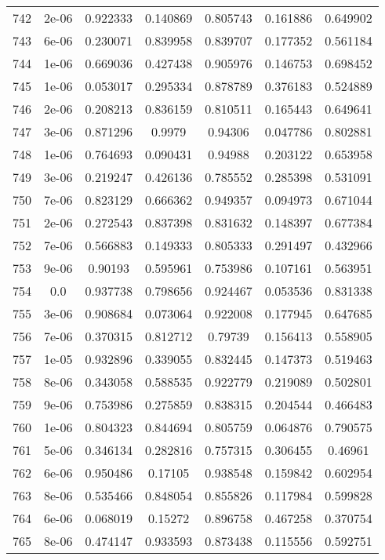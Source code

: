 \begin{table}
\begin{tabular*}{\linewidth}{c|c|c|c|c|c|c}
742 & 2e-06 & 0.922333 & 0.140869 & 0.805743 & 0.161886 & 0.649902\\
743 & 6e-06 & 0.230071 & 0.839958 & 0.839707 & 0.177352 & 0.561184\\
744 & 1e-06 & 0.669036 & 0.427438 & 0.905976 & 0.146753 & 0.698452\\
745 & 1e-06 & 0.053017 & 0.295334 & 0.878789 & 0.376183 & 0.524889\\
746 & 2e-06 & 0.208213 & 0.836159 & 0.810511 & 0.165443 & 0.649641\\
747 & 3e-06 & 0.871296 & 0.9979 & 0.94306 & 0.047786 & 0.802881\\
748 & 1e-06 & 0.764693 & 0.090431 & 0.94988 & 0.203122 & 0.653958\\
749 & 3e-06 & 0.219247 & 0.426136 & 0.785552 & 0.285398 & 0.531091\\
750 & 7e-06 & 0.823129 & 0.666362 & 0.949357 & 0.094973 & 0.671044\\
751 & 2e-06 & 0.272543 & 0.837398 & 0.831632 & 0.148397 & 0.677384\\
752 & 7e-06 & 0.566883 & 0.149333 & 0.805333 & 0.291497 & 0.432966\\
753 & 9e-06 & 0.90193 & 0.595961 & 0.753986 & 0.107161 & 0.563951\\
754 & 0.0 & 0.937738 & 0.798656 & 0.924467 & 0.053536 & 0.831338\\
755 & 3e-06 & 0.908684 & 0.073064 & 0.922008 & 0.177945 & 0.647685\\
756 & 7e-06 & 0.370315 & 0.812712 & 0.79739 & 0.156413 & 0.558905\\
757 & 1e-05 & 0.932896 & 0.339055 & 0.832445 & 0.147373 & 0.519463\\
758 & 8e-06 & 0.343058 & 0.588535 & 0.922779 & 0.219089 & 0.502801\\
759 & 9e-06 & 0.753986 & 0.275859 & 0.838315 & 0.204544 & 0.466483\\
760 & 1e-06 & 0.804323 & 0.844694 & 0.805759 & 0.064876 & 0.790575\\
761 & 5e-06 & 0.346134 & 0.282816 & 0.757315 & 0.306455 & 0.46961\\
762 & 6e-06 & 0.950486 & 0.17105 & 0.938548 & 0.159842 & 0.602954\\
763 & 8e-06 & 0.535466 & 0.848054 & 0.855826 & 0.117984 & 0.599828\\
764 & 6e-06 & 0.068019 & 0.15272 & 0.896758 & 0.467258 & 0.370754\\
765 & 8e-06 & 0.474147 & 0.933593 & 0.873438 & 0.115556 & 0.592751\\
\end{tabular*}
\end{table}
